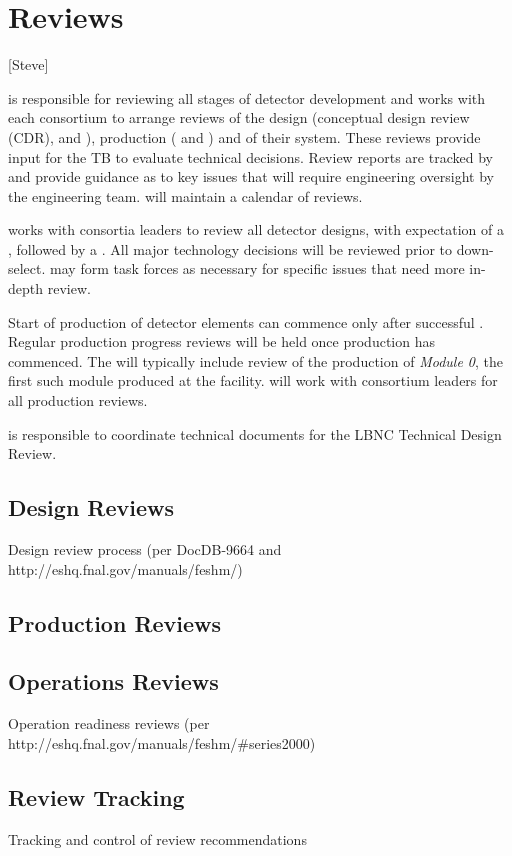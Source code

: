 \chapter{Reviews}
\label{vl:tc-review}

[Steve]

 is responsible for reviewing all stages of detector development
and works with each consortium to arrange reviews of the design
(conceptual design review (CDR),  and ), production ( and
) and  of their system.  These
reviews provide input for the TB to evaluate technical decisions.
Review reports are tracked by  and provide guidance as to
key issues that will require engineering oversight by the 
engineering team.  will maintain a calendar of 
reviews.

 works with consortia leaders to review all detector designs,
with expectation of a , followed by a .  All
major technology decisions will be reviewed prior to down-select.  
may form task forces as necessary for specific issues that need more
in-depth review.


Start of production of detector elements can commence only after
successful . Regular production progress
reviews will be held once production has commenced. The 
will typically include review of the production of \textit{Module 0}, the
first such module produced at the facility.  will work with
consortium leaders for all production reviews.

 is responsible to coordinate technical documents for the LBNC
Technical Design Review.

\section{Design Reviews}

Design review process (per DocDB-9664 and http://eshq.fnal.gov/manuals/feshm/)

\section{Production Reviews}

\section{Operations Reviews}

Operation readiness reviews (per http://eshq.fnal.gov/manuals/feshm/\#series2000)

\section{Review Tracking}

Tracking and control of review recommendations

